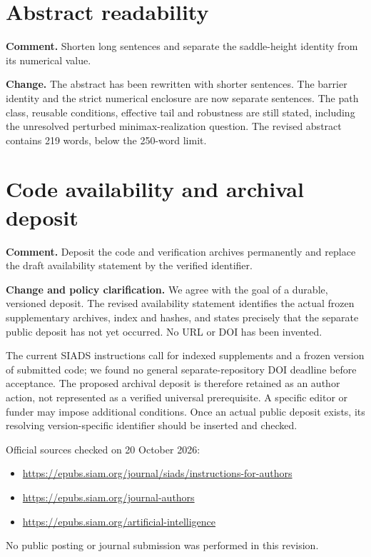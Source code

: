 \documentclass[10pt]{article}
\begin{document}
\section{Abstract readability}

\textbf{Comment.} Shorten long sentences and separate the saddle-height
identity from its numerical value.

\textbf{Change.} The abstract has been rewritten with shorter sentences.
The barrier identity and the strict numerical enclosure are now separate
sentences. The path class, reusable conditions, effective tail and
robustness are still stated, including the unresolved perturbed
minimax-realization question. The revised abstract contains 219 words,
below the 250-word limit.

\clearpage
\section{Code availability and archival deposit}

\textbf{Comment.} Deposit the code and verification archives permanently
and replace the draft availability statement by the verified identifier.

\textbf{Change and policy clarification.} We agree with the goal of a
durable, versioned deposit. The revised availability statement identifies
the actual frozen supplementary archives, index and hashes, and states
precisely that the separate public deposit has not yet occurred.
No URL or DOI has been invented.

The current SIADS instructions call for indexed supplements and a frozen
version of submitted code;
we found no general separate-repository DOI deadline before acceptance.
The proposed archival deposit is therefore retained as an author action,
not represented as a verified universal prerequisite. A specific editor
or funder may impose additional conditions. Once an actual public
deposit exists, its resolving version-specific identifier should be
inserted and checked.

\noindent Official sources checked on 20 October 2026:
\begin{itemize}
\item \url{https://epubs.siam.org/journal/siads/instructions-for-authors}
\item \url{https://epubs.siam.org/journal-authors}
\item \url{https://epubs.siam.org/artificial-intelligence}
\end{itemize}
No public posting or journal submission was performed in this revision.
\end{document}
